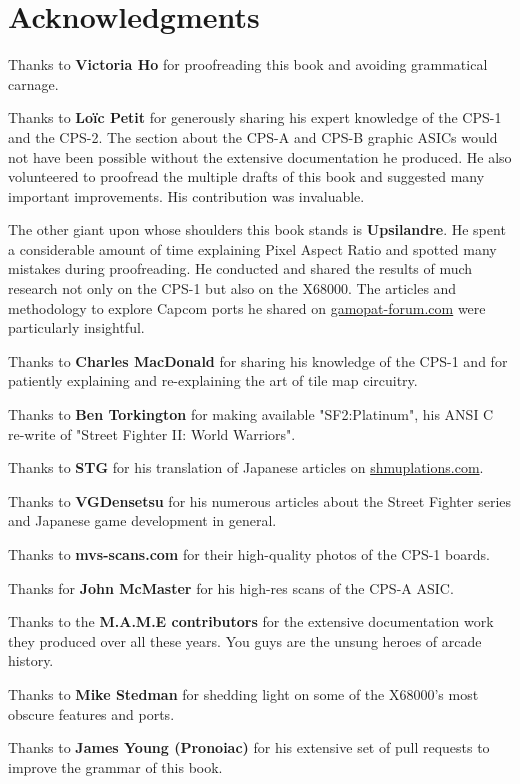 \chapter*{Acknowledgments} 

Thanks to \textbf{Victoria Ho} for proofreading this book and avoiding grammatical carnage.

Thanks to \textbf{Lo\"{i}c Petit} for generously sharing his expert knowledge of the CPS-1 and the CPS-2. The section about the CPS-A and CPS-B graphic ASICs would not have been possible without the extensive documentation he produced. He also volunteered to proofread the multiple drafts of this book and suggested many important improvements. His contribution was invaluable.

The other giant upon whose shoulders this book stands is \textbf{Upsilandre}. He spent a considerable amount of time explaining Pixel Aspect Ratio and spotted many mistakes during proofreading. He conducted and shared the results of much research not only on the CPS-1 but also on the X68000. The articles and methodology to explore Capcom ports he shared on \href{https://www.gamopat-forum.com}{gamopat-forum.com} were particularly insightful.

Thanks to \textbf{Charles MacDonald} for sharing his knowledge of the CPS-1 and for patiently explaining and re-explaining the art of tile map circuitry.

Thanks to \textbf{Ben Torkington} for making available "SF2:Platinum", his ANSI C re-write of "Street Fighter II: World Warriors".

Thanks to \textbf{STG} for his translation of Japanese articles on \href{https://shmuplations.com}{shmuplations.com}.

Thanks to \textbf{VGDensetsu} for his numerous articles about the Street Fighter series and Japanese game development in general.

Thanks to \textbf{mvs-scans.com} for their high-quality photos of the CPS-1 boards.

Thanks for \textbf{John McMaster} for his high-res scans of the CPS-A ASIC.

Thanks to the \textbf{M.A.M.E contributors} for the extensive documentation work they produced over all these years. You guys are the unsung heroes of arcade history.

Thanks to \textbf{Mike Stedman} for shedding light on some of the X68000's most obscure features and ports.

Thanks to \textbf{James Young (Pronoiac)} for his extensive set of pull requests to improve the grammar of this book.